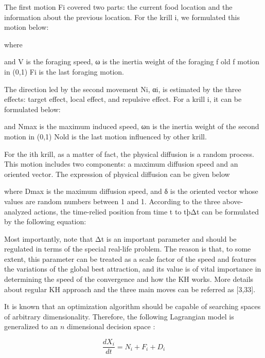 
The first motion Fi covered two parts: the current food location and the information about the previous location. For the krill i, we formulated this motion below:

where

and V is the foraging speed, ω is the inertia weight of the foraging f old f
motion in (0,1) Fi is the last foraging motion.

The direction led by the second movement Ni, αi, is estimated
by the three effects: target effect, local effect, and repulsive effect. For a krill i, it can be formulated below:

and Nmax is the maximum induced speed, ωn is the inertia weight of the second motion in (0,1) Nold is the last motion influenced by
other krill.

For the ith krill, as a matter of fact, the physical diffusion
is a random process. This motion includes two components: a maximum diffusion speed and an oriented vector. The expression of physical diffusion can be given below

where Dmax is the maximum diffusion speed, and δ is the oriented vector whose values are random numbers between  1 and 1.
According to the three above-analyzed actions, the time-relied position from time t to tþΔt can be formulated by the following equation:

Most importantly, note that Δt is an important parameter and should be regulated in terms of the special real-life problem. The reason is that, to some extent, this parameter can be treated as a scale factor of the speed and features the variations of the global best attraction, and its value is of vital importance in determining the speed of the convergence and how the KH works. More details about regular KH approach and the three main moves can be referred as [3,33].



















It is known that an optimization algorithm should be capable of searching spaces of arbitrary dimensionality. Therefore, the following Lagrangian model is generalized to an $n$ dimensional decision space \cite{gandomi2012krill}:

\begin{equation}
\frac{dX_i}{dt} =N_i+F_i+D_i
\end{equation}

